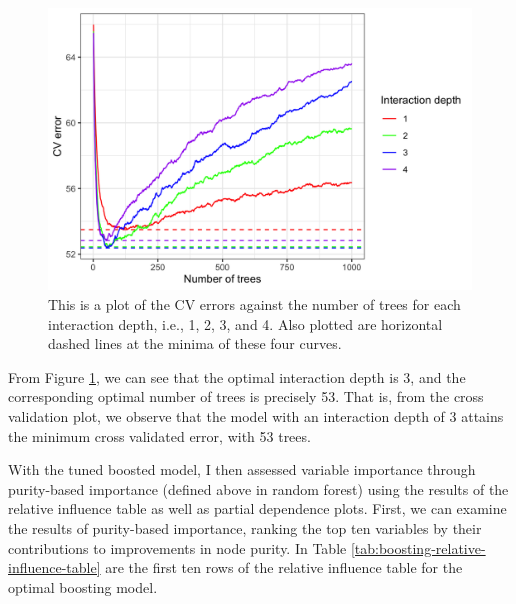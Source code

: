 \documentclass[
]{article}
\begin{document}
\begin{figure}[H]

{\centering \includegraphics[width=0.9\linewidth]{../results/cv-errors-vs-ntrees-vary-depth-plot} 

}

\caption{This is a plot of the CV errors against the number of trees for each interaction depth, i.e., 1, 2, 3, and 4. Also plotted are horizontal dashed lines at the minima of these four curves.}\label{fig:cv-errors-vs-ntrees-vary-depth-plot}
\end{figure}

From Figure \ref{fig:cv-errors-vs-ntrees-vary-depth-plot}, we can see that the optimal interaction depth is 3, and the corresponding optimal number of trees is precisely 53. That is, from the cross validation plot, we observe that the model with an interaction depth of 3 attains the minimum cross validated error, with 53 trees.

With the tuned boosted model, I then assessed variable importance through purity-based importance (defined above in random forest) using the results of the relative influence table as well as partial dependence plots. First, we can examine the results of purity-based importance, ranking the top ten variables by their contributions to improvements in node purity. In Table \ref{tab:boosting-relative-influence-table} are the first ten rows of the relative influence table for the optimal boosting model.
\end{document}
